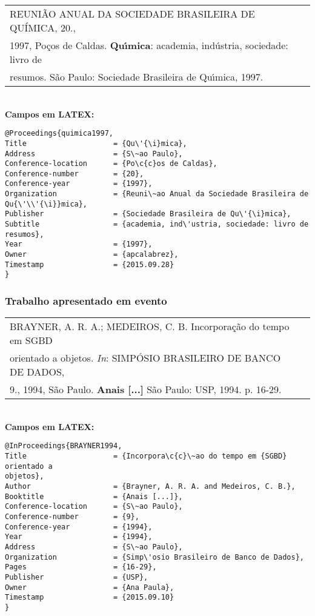 \begin{tabular}{|l|c|} \hline
	REUNI\~AO ANUAL DA SOCIEDADE BRASILEIRA DE QU\'IMICA, 20., \\1997, Po\c{c}os de Caldas. \textbf{Qu\'{\i}mica}: academia, ind\'ustria, sociedade: livro de \\resumos. S\~ao Paulo: Sociedade Brasileira de Qu\'{\i}mica, 1997.  \\\hline
\end{tabular} \\

\textbf{Campos em LATEX:} 

\begin{verbatim}
@Proceedings{quimica1997,
Title                    = {Qu\'{\i}mica},
Address                  = {S\~ao Paulo},
Conference-location      = {Po\c{c}os de Caldas},
Conference-number        = {20},
Conference-year          = {1997},
Organization             = {Reuni\~ao Anual da Sociedade Brasileira de 
Qu{\'\\'{\i}}mica},
Publisher                = {Sociedade Brasileira de Qu\'{\i}mica},
Subtitle                 = {academia, ind\'ustria, sociedade: livro de 
resumos},
Year                     = {1997},
Owner                    = {apcalabrez},
Timestamp                = {2015.09.28}
}
\end{verbatim}

\subsubsection{Trabalho apresentado em evento}

\begin{tabular}{|l|c|} \hline
	BRAYNER, A. R. A.; MEDEIROS, C. B. Incorpora\c{c}\~ao do tempo em SGBD \\orientado a objetos. \textit{In}: SIMP\'OSIO BRASILEIRO DE BANCO DE DADOS, \\9., 1994, S\~ao Paulo. \textbf{Anais [...]} S\~ao Paulo: USP, 1994. p. 16-29.  \\\hline
\end{tabular} \\

\textbf{Campos em LATEX:} 

\begin{verbatim}
@InProceedings{BRAYNER1994,
Title                    = {Incorpora\c{c}\~ao do tempo em {SGBD} orientado a 
objetos},
Author                   = {Brayner, A. R. A. and Medeiros, C. B.},
Booktitle                = {Anais [...]},
Conference-location      = {S\~ao Paulo},
Conference-number        = {9},
Conference-year          = {1994},
Year                     = {1994},
Address                  = {S\~ao Paulo},
Organization             = {Simp\'osio Brasileiro de Banco de Dados},
Pages                    = {16-29},
Publisher                = {USP},
Owner                    = {Ana Paula},
Timestamp                = {2015.09.10}
}
\end{verbatim}

